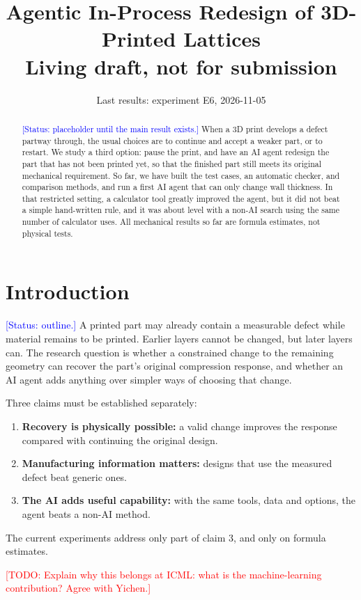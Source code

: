 \documentclass[11pt]{article}
\title{Agentic In-Process Redesign of 3D-Printed Lattices\\ \large Living draft, not for submission}
\author{\todo{authors and order, to agree with Yichen. ICML review is anonymous.}}
\date{Last results: experiment E6, 2026-11-05}
\newcommand{\todo}[1]{\textcolor{red}{[TODO: #1]}}
\newcommand{\status}[1]{\textcolor{blue}{[Status: #1]}}
\begin{document}
\maketitle

\begin{abstract}
\status{placeholder until the main result exists.}
When a 3D print develops a defect partway through, the usual choices are to continue and accept a weaker part, or to restart. We study a third option: pause the print, and have an AI agent redesign the part that has not been printed yet, so that the finished part still meets its original mechanical requirement. So far, we have built the test cases, an automatic checker, and comparison methods, and run a first AI agent that can only change wall thickness. In that restricted setting, a calculator tool greatly improved the agent, but it did not beat a simple hand-written rule, and it was about level with a non-AI search using the same number of calculator uses. All mechanical results so far are formula estimates, not physical tests.
\end{abstract}

\section{Introduction}
\status{outline.}
A printed part may already contain a measurable defect while material remains to be printed. Earlier layers cannot be changed, but later layers can. The research question is whether a constrained change to the remaining geometry can recover the part's original compression response, and whether an AI agent adds anything over simpler ways of choosing that change.

Three claims must be established separately:
\begin{enumerate}
  \item \textbf{Recovery is physically possible:} a valid change improves the response compared with continuing the original design.
  \item \textbf{Manufacturing information matters:} designs that use the measured defect beat generic ones.
  \item \textbf{The AI adds useful capability:} with the same tools, data and options, the agent beats a non-AI method.
\end{enumerate}
The current experiments address only part of claim 3, and only on formula estimates.

\todo{Explain why this belongs at ICML: what is the machine-learning contribution? Agree with Yichen.}
\end{document}
